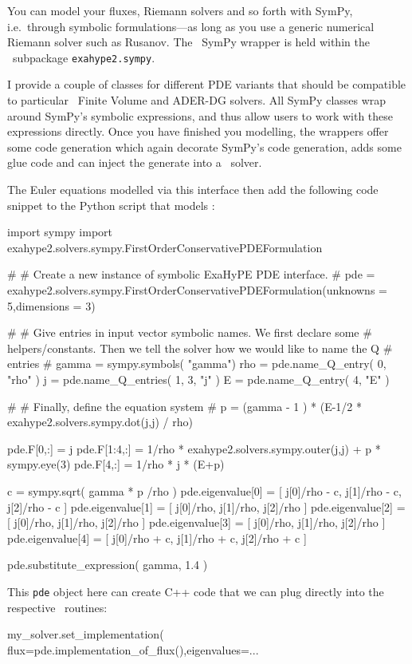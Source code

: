 You can model your fluxes, Riemann solvers and so forth with SymPy, 
i.e.~through symbolic formulations---as long as you use a generic numerical
Riemann solver such as Rusanov.
The \ExaHyPE\ SymPy wrapper is
held within the \ExaHyPE\ subpackage \texttt{exahype2.sympy}.


I provide a couple of classes for different PDE variants that should be
compatible to particular \ExaHyPE\ Finite Volume and ADER-DG solvers.
All SymPy classes wrap around SymPy's symbolic expressions, and thus allow users
to work with these expressions directly.
Once you have finished you modelling, the wrappers offer some code generation
which again decorate SymPy's code generation, adds some glue code and can inject
the generate into a \Peano\ solver.


The Euler equations modelled via this interface then add the following code
snippet to the Python script that models \Peano:

\begin{code}
import sympy
import exahype2.solvers.sympy.FirstOrderConservativePDEFormulation


#
# Create a new instance of symbolic ExaHyPE PDE interface.
#
pde = exahype2.solvers.sympy.FirstOrderConservativePDEFormulation(unknowns = 5,dimensions = 3)

#
# Give entries in input vector symbolic names. We first declare some
# helpers/constants. Then we tell the solver how we would like to name the Q 
# entries
#
gamma = sympy.symbols( "gamma")
rho   = pde.name_Q_entry( 0, "rho" )
j     = pde.name_Q_entries( 1, 3, "j" )
E     = pde.name_Q_entry( 4, "E" )

#
# Finally, define the equation system
#
p = (gamma - 1 ) * (E-1/2 * exahype2.solvers.sympy.dot(j,j) / rho)

pde.F[0,:]   = j
pde.F[1:4,:] = 1/rho * exahype2.solvers.sympy.outer(j,j) + p * sympy.eye(3)
pde.F[4,:]   = 1/rho * j * (E+p)

c = sympy.sqrt( gamma * p /rho )
pde.eigenvalue[0] = [ j[0]/rho - c, j[1]/rho - c, j[2]/rho - c ]
pde.eigenvalue[1] = [ j[0]/rho, j[1]/rho, j[2]/rho ]
pde.eigenvalue[2] = [ j[0]/rho, j[1]/rho, j[2]/rho ]
pde.eigenvalue[3] = [ j[0]/rho, j[1]/rho, j[2]/rho ]
pde.eigenvalue[4] = [ j[0]/rho + c, j[1]/rho + c, j[2]/rho + c ]

pde.substitute_expression( gamma, 1.4 )
\end{code}


\noindent
This \texttt{pde} object here can create C++ code that we can plug directly into
the respective \Peano\ routines:
\begin{code}
my_solver.set_implementation( flux=pde.implementation_of_flux(),eigenvalues=...
\end{code}

